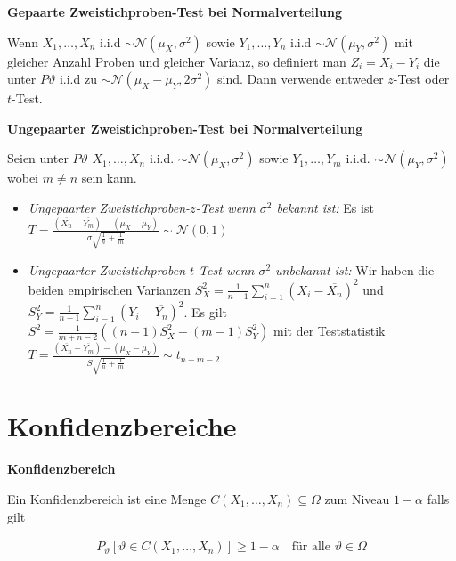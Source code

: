 \documentclass[25pt]{sciposter}
\newenvironment{method}[1]{\begin{mdframed}[backgroundcolor=blue!10,innertopmargin=15pt, innerbottommargin=15pt,nobreak=true]
		\textbf{#1 }
	}
	{ 
	\end{mdframed}
}
\begin{document}
\begin{multicols}{3}
\begin{method}{Gepaarte Zweistichproben-Test bei Normalverteilung}
	Wenn $X_1,\ldots,X_n$ i.i.d $\sim \mathcal{N}(\mu_X,\sigma^2)$ sowie $Y_1,\ldots,Y_n$ i.i.d $\sim \mathcal{N}(\mu_Y,\sigma^2)$ mit gleicher Anzahl Proben und gleicher Varianz, so definiert man $Z_i = X_i-Y_i$ die unter $P\vartheta$ i.i.d zu $\sim \mathcal{N}(\mu_X-\mu_Y,2\sigma^2)$ sind. Dann verwende entweder $z$-Test oder $t$-Test.
\end{method}


\begin{method}{Ungepaarter Zweistichproben-Test bei Normalverteilung}
	Seien unter $P\vartheta$ $X_1,\ldots,X_n$ i.i.d. $\sim \mathcal{N}(\mu_X,\sigma^2)$ sowie $Y_1,\ldots,Y_m$ i.i.d. $\sim \mathcal{N}(\mu_Y,\sigma^2)$ wobei $m\neq n$ sein kann.
	\begin{itemize}
		\item \textit{Ungepaarter Zweistichproben-$z$-Test wenn $\sigma^2$ bekannt ist:} Es ist $T = \frac{(\overline{X_n} -\overline{Y_m}) - (\mu_X - \mu_Y)}{\sigma \sqrt{\frac{1}{n} + \frac{1}{m}}} \sim \mathcal{N}(0,1)$
		\item \textit{Ungepaarter Zweistichproben-$t$-Test wenn $\sigma^2$ unbekannt ist:} Wir haben die beiden empirischen Varianzen
		$S^2_X = \frac{1}{n-1} \sum_{i=1}^{n} (X_i - \overline{X_n})^2$ und $S^2_Y = \frac{1}{n-1} \sum_{i=1}^{n} (Y_i - \overline{Y_n})^2$. Es gilt $S^2 = \frac{1}{m+n-2}\left(\left(n-1\right)S_X^2 + \left(m-1\right)S_Y^2\right)$ mit der Teststatistik $T = \frac{(\overline{X_n} -\overline{Y_m}) - (\mu_X - \mu_Y)}{S \sqrt{\frac{1}{n} + \frac{1}{m}}} \sim t_{n+m-2}$
	\end{itemize}
	
\end{method}


\section{Konfidenzbereiche}

\begin{method}{Konfidenzbereich}
Ein Konfidenzbereich ist eine Menge $C(X_1,\ldots,X_n) \subseteq \Omega$ zum Niveau $1-\alpha$ falls gilt

\begin{align*}
	P_{\vartheta} \left[\vartheta \in C(X_1,\ldots,X_n) \right] \geq 1 - \alpha \quad \text{für alle } \vartheta \in \Omega
\end{align*}
\end{method}



\end{multicols}
\end{document}
